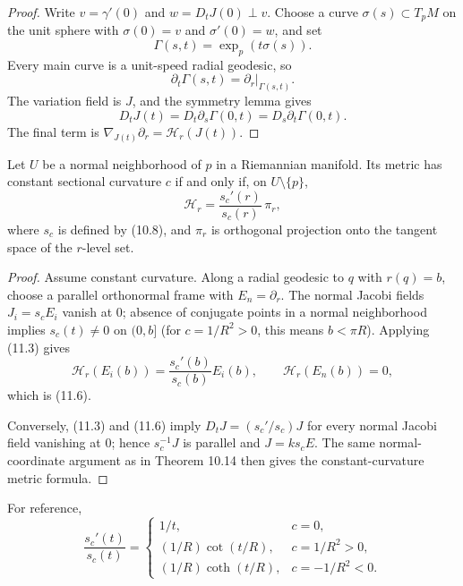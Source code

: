 \begin{proof}
\sketch
Write $v=\gamma'(0)$ and $w=D_tJ(0)\perp v$.  Choose a curve
$\sigma(s)\subset T_pM$ on the unit sphere with $\sigma(0)=v$ and
$\sigma'(0)=w$, and set
\[
\Gamma(s,t)=\exp_p(t\sigma(s)).
\]
Every main curve is a unit-speed radial geodesic, so
\begin{equation}
\partial_t\Gamma(s,t)=\partial_r|_{\Gamma(s,t)}. \tag{11.4}
\end{equation}
The variation field is $J$, and the symmetry lemma gives
\begin{equation}
D_tJ(t)=D_t\partial_s\Gamma(0,t)=D_s\partial_t\Gamma(0,t). \tag{11.5}
\end{equation}
The final term is $\nabla_{J(t)}\partial_r=\mathcal H_r(J(t))$.
\end{proof}

\begin{proposition}
\label{prop:hessian-radial-distance-constant-curvature}
Let $U$ be a normal neighborhood of $p$ in a Riemannian manifold.  Its metric
has constant sectional curvature $c$ if and only if, on $U\setminus\{p\}$,
\begin{equation}
\mathcal H_r=\frac{s_c'(r)}{s_c(r)}\,\pi_r, \tag{11.6}
\end{equation}
where $s_c$ is defined by (10.8), and $\pi_r$ is orthogonal projection onto
the tangent space of the $r$-level set.
\end{proposition}

\begin{proof}
\sketch
Assume constant curvature.  Along a radial geodesic to $q$ with $r(q)=b$,
choose a parallel orthonormal frame with $E_n=\partial_r$.  The normal Jacobi
fields $J_i=s_cE_i$ vanish at $0$; absence of conjugate points in a normal
neighborhood implies $s_c(t)\ne0$ on $(0,b]$ (for $c=1/R^2>0$, this means
$b<\pi R$).  Applying (11.3) gives
\[
\mathcal H_r(E_i(b))=\frac{s_c'(b)}{s_c(b)}E_i(b),
\qquad
\mathcal H_r(E_n(b))=0,
\]
which is (11.6).

Conversely, (11.3) and (11.6) imply
$D_tJ=(s_c'/s_c)J$ for every normal Jacobi field vanishing at $0$; hence
$s_c^{-1}J$ is parallel and $J=ks_cE$.  The same normal-coordinate argument
as in Theorem 10.14 then gives the constant-curvature metric formula.
\end{proof}

For reference,
\[
\frac{s_c'(t)}{s_c(t)}=
\begin{cases}
1/t,&c=0,\\
(1/R)\cot(t/R),&c=1/R^2>0,\\
(1/R)\coth(t/R),&c=-1/R^2<0.
\end{cases}
\]

